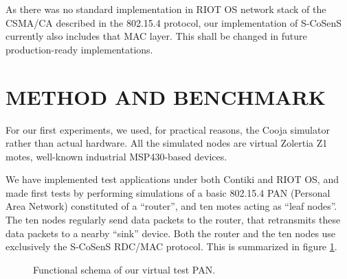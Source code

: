 \documentclass[a4paper,twoside]{article}
\begin{document}
As there was no standard implementation in RIOT OS network stack of
the CSMA/CA described in the 802.15.4 protocol, our implementation of
S-CoSenS currently also includes that MAC layer. This shall be changed
in future production-ready implementations.



\section{\uppercase{Method and Benchmark}}

For our first experiments, we used, for practical reasons, the Cooja
simulator rather than actual hardware. All the simulated nodes are
virtual Zolertia Z1 motes, well-known industrial MSP430-based devices.

We have implemented test applications under both Contiki and RIOT OS, and
made first tests by performing simulations of a basic 802.15.4 PAN
(Personal Area Network) constituted of a ``router'', and ten motes
acting as ``leaf nodes''. The ten nodes regularly send data packets to
the router, that retransmits these data packets to a nearby ``sink'' device.
Both the router and the ten nodes use exclusively the S-CoSenS RDC/MAC
protocol. This is summarized in figure \ref{FigPANtest}.

\begin{figure}[!h]
\centering
{}
\caption{Functional schema of our virtual test PAN.}
\label{FigPANtest}
\end{figure}
\end{document}
